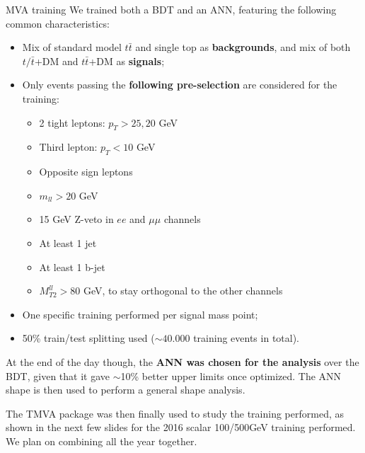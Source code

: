 \documentclass[8pt]{beamer}
\begin{document}
\begin{frame}{MVA training}
\justifying
We \alert{trained both a BDT and an ANN}, featuring the following common characteristics:
\vspace{-5pt}
\begin{itemize}
\justifying
\item Mix of standard model $t \bar t$ and single top as \textbf{backgrounds}, and mix of both $t/\bar t$+DM and $t \bar t$+DM as \textbf{signals};
\item Only events passing the \textbf{following pre-selection} are considered for the training:
\vspace{-10pt}
\begin{multicols}{2}
\begin{itemize}
\item 2 tight leptons: $p_T > 25, 20$ GeV
\item Third lepton: $p_T < 10$ GeV
\item Opposite sign leptons
\item $m_{ll} > 20$ GeV
\item 15 GeV Z-veto in $ee$ and $\mu \mu$ channels
\item At least 1 jet
\item At least 1 b-jet
\item $M_{T2}^{ll} > 80$ GeV, to stay orthogonal to the other channels
\end{itemize}
\end{multicols} 
\vspace{-10pt}
\item One specific training performed per signal mass point;
\item 50\% train/test splitting used ($\sim 40.000$ training events in total).
\end{itemize} \vfill

At the end of the day though, the \textbf{ANN was chosen for the analysis} over the BDT, given that it gave $\sim$10\% better upper limits once optimized. The ANN shape is then used to perform a general \alert{shape analysis}. \vfill

The TMVA package was then finally used to study the training performed, as shown in the next few slides for the 2016 scalar 100/500GeV training performed. We plan on combining all the year together. \vfill	
\end{frame}
\end{document}
